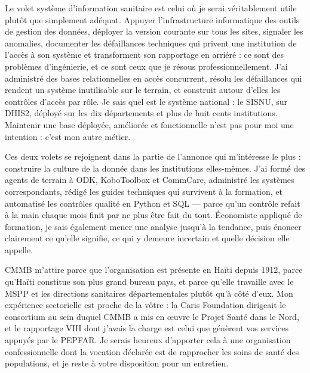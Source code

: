 \documentclass[11pt,a4paper,sans]{moderncv}
\begin{document}
Le volet système d'information sanitaire est celui où je serai véritablement utile plutôt que simplement adéquat. Appuyer l'infrastructure informatique des outils de gestion des données, déployer la version courante sur tous les sites, signaler les anomalies, documenter les défaillances techniques qui privent une institution de l'accès à son système et transforment son rapportage en arriéré : ce sont des problèmes d'ingénierie, et ce sont ceux que je résous professionnellement. J'ai administré des bases relationnelles en accès concurrent, résolu les défaillances qui rendent un système inutilisable sur le terrain, et construit autour d'elles les contrôles d'accès par rôle. Je sais quel est le système national : le SISNU, sur DHIS2, déployé sur les dix départements et plus de huit cents institutions. Maintenir une base déployée, améliorée et fonctionnelle n'est pas pour moi une intention : c'est mon autre métier.

Ces deux volets se rejoignent dans la partie de l'annonce qui m'intéresse le plus : construire la culture de la donnée dans les institutions elles-mêmes. J'ai formé des agents de terrain à ODK, KoboToolbox et CommCare, administré les systèmes correspondants, rédigé les guides techniques qui survivent à la formation, et automatisé les contrôles qualité en Python et SQL --- parce qu'un contrôle refait à la main chaque mois finit par ne plus être fait du tout. Économiste appliqué de formation, je sais également mener une analyse jusqu'à la tendance, puis énoncer clairement ce qu'elle signifie, ce qui y demeure incertain et quelle décision elle appelle.

CMMB m'attire parce que l'organisation est présente en Haïti depuis 1912, parce qu'Haïti constitue son plus grand bureau pays, et parce qu'elle travaille avec le MSPP et les directions sanitaires départementales plutôt qu'à côté d'eux. Mon expérience sectorielle est proche de la vôtre : la Caris Foundation dirigeait le consortium au sein duquel CMMB a mis en œuvre le Projet Santé dans le Nord, et le rapportage VIH dont j'avais la charge est celui que génèrent vos services appuyés par le PEPFAR. Je serais heureux d'apporter cela à une organisation confessionnelle dont la vocation déclarée est de rapprocher les soins de santé des populations, et je reste à votre disposition pour un entretien.

\makeletterclosing
\end{document}
